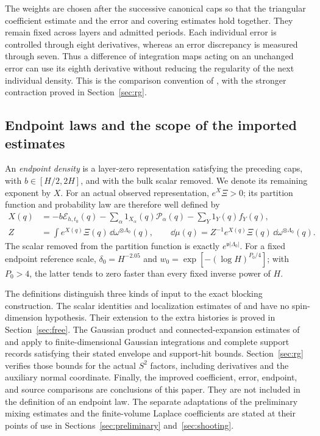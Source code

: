 The weights are chosen after the successive canonical caps so that the
triangular coefficient estimate and the error and covering estimates
hold together.  They remain fixed across layers and admitted periods.
Each individual error is controlled through eight derivatives, whereas
an error discrepancy is measured through seven.  Thus a difference of
integration maps acting on an unchanged error can use its eighth
derivative without reducing the regularity of the next individual
density.  This is the comparison convention of , with
the stronger contraction proved in Section~\ref{sec:rg}.


\subsection{Endpoint laws and the scope of the imported estimates}
\label{setup:endpoints}

An \emph{endpoint density} is a layer-zero representation satisfying the
preceding caps, with \(b\in[H/2,2H]\), and with the bulk scalar removed.
We denote its remaining exponent by \(X\).  For an actual observed
representation, \(e^X\Xi>0\); its partition function and probability
law are therefore well defined by
\begin{equation}
 \begin{split}
 X(q)&=-b\mathcal E_{h,t_0}(q)
       -\sum_\alpha1_{X_\alpha}(q)\mathcal P_\alpha(q)
       -\sum_Y1_Y(q)f_Y(q),\\
 Z&=\int e^{X(q)}\Xi(q)\,\dd\omega^{\otimes\Lambda_0}(q),
 \qquad
 \dd\mu(q)=Z^{-1}e^{X(q)}\Xi(q)\,\dd\omega^{\otimes\Lambda_0}(q).
 \end{split}
 \label{setup:endpoint-law}
\end{equation}
The scalar removed from the
partition function is exactly \(e^{\mathfrak v|\Lambda_0|}\).
For a fixed endpoint reference scale, \(\delta_0=H^{-2.05}\) and
\(w_0=\exp[-(\log H)^{P_0/4}]\); with \(P_0>4\), the latter tends
to zero faster than every fixed inverse power of \(H\).

The definitions distinguish three kinds of input to the exact blocking
construction.
The scalar identities and localization estimates of
 and  have no spin-dimension
hypothesis.  Their extension to the extra histories is proved in
Section~\ref{sec:free}.  The Gaussian product and connected-expansion
estimates of  and 
apply to finite-dimensional Gaussian integrations and complete support
records satisfying their stated envelope and support-hit bounds.
Section~\ref{sec:rg} verifies those bounds for the actual \(S^2\)
factors, including derivatives and the auxiliary normal coordinate.
Finally, the improved coefficient, error, endpoint, and source
comparisons are conclusions of this paper.  They are not included in
the definition of an endpoint law.  The separate adaptations of the
preliminary mixing estimates and the finite-volume Laplace coefficients
are stated at their points of use in Sections~\ref{sec:preliminary}
and~\ref{sec:shooting}.

